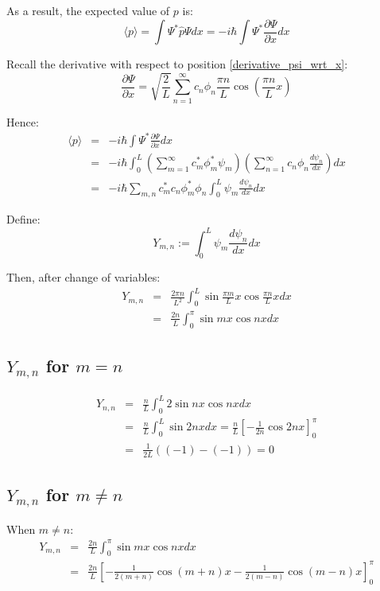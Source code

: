 \documentclass[12pt]{article}
\begin{document}
\noindent As a result, the expected value of $p$ is:
\begin{equation}
\langle p \rangle = \int \Psi^* \hat{p} \Psi dx = - i \hbar \int \Psi^* \frac{\partial \Psi}{\partial x} dx
\end{equation}

\noindent Recall the derivative with respect to position \eqref{derivative_psi_wrt_x}:
\begin{equation*}
\frac{\partial \Psi}{\partial x} = 
\sqrt{\frac{2}{L}} \sum_{n=1}^{\infty} c_n \phi_n \frac{\pi n}{L} \cos \left( \frac{\pi n}{L} x \right)
\end{equation*}

\noindent Hence:
\begin{eqnarray*}
\langle p \rangle &=& - i \hbar \int \Psi^* \frac{\partial \Psi}{\partial x} dx \\
				&=& - i \hbar \int_0^L \left(  \sum_{m=1}^{\infty}  c_m^* \phi_m^* \psi_m
					 \right) \left( 
					 	\sum_{n=1}^{\infty}c_n \phi_n \frac{d \psi_n}{dx}
					 	\right) dx \\
				&=& - i \hbar \sum_{m,n} c_m^* c_n \phi^*_m \phi_n \int_0^L\psi_m  \frac{d \psi_n}{dx} dx
\end{eqnarray*}

\noindent Define:
\begin{equation}
Y_{m, n} := \int_0^L \psi_m \frac{d \psi_n}{dx} dx
\end{equation}

\noindent Then, after change of variables:
\begin{eqnarray*}
Y_{m, n} &=&  \frac{2 \pi n}{L^2} \int_0^L \sin \frac{\pi m}{L}x \cos \frac{\pi n}{L}x dx \\
 		&=& \frac{2n}{L} \int_{0}^{\pi} \sin mx \cos nx dx
\end{eqnarray*}

\subsection{$Y_{m, n}$ for $m = n$}
\begin{eqnarray}
Y_{n, n} &=& \frac{n}{L} \int_0^L 2 \sin nx \cos nx dx \\
 		&=& \frac{n}{L} \int_0^L \sin 2nx dx = \frac{n}{L} \left[-\frac{1}{2n} \cos 2nx \right]_0^{\pi} \\
 		&=& \frac{1}{2L} \left( 	(-1) - (-1)	\right) = 0
\end{eqnarray}


\subsection{$Y_{m, n}$ for $m \neq n$}
When $m \neq n$:
\begin{eqnarray*}
Y_{m, n} &=& \frac{2n}{L} \int_{0}^{\pi} \sin mx \cos nx dx \\
		&=& \frac{2n}{L} \left[
			-\frac{1}{2(m+n)} \cos (m+n) x - \frac{1}{2(m-n)} \cos (m-n) x
		\right]^{\pi}_{0}
\end{eqnarray*}
\end{document}
